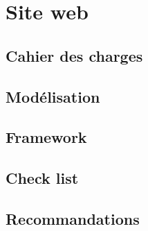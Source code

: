 \chapter{Site web}
    \section{Cahier des charges}
    \section{Modélisation}
    \section{Framework}
        \cite{ref_framework_mvc}

    \section{Check list}
    \section{Recommandations}

